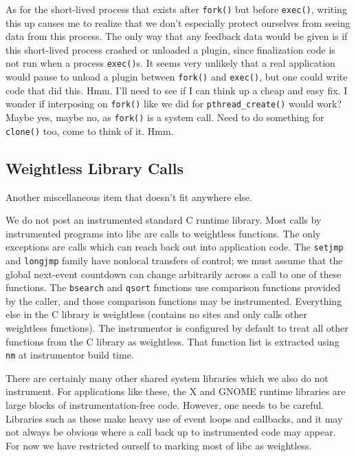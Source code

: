 \documentclass[10pt,twocolumn]{article}
\begin{document}
As for the short-lived process that exists after \texttt{fork()} but
before \texttt{exec()}, writing this up causes me to realize that we
don't especially protect ourselves from seeing data from this
process.  The only way that any feedback data would be given is if
this short-lived process crashed or unloaded a plugin, since
finalization code is not run when a process \texttt{exec()}s.  It
seems very unlikely that a real application would pause to unload a
plugin between \texttt{fork()} and \texttt{exec()}, but one could
write code that did this.  Hmm.  I'll need to see if I can think up a
cheap and easy fix.  I wonder if interposing on \texttt{fork()} like
we did for \texttt{pthread\_create()} would work?  Maybe yes, maybe
no, as \texttt{fork()} is a system call.  Need to do something for
\texttt{clone()} too, come to think of it.  Hmm.

\subsection{Weightless Library Calls}

Another miscellaneous item that doesn't fit anywhere else.

We do not post an instrumented standard C runtime library.  Most calls
by instrumented programs into libc are calls to weightless functions.
The only exceptions are calls which can reach back out into
application code.  The \texttt{setjmp} and \texttt{longjmp} family
have nonlocal transfers of control; we must assume that the global
next-event countdown can change arbitrarily across a call to one of
these functions.  The \texttt{bsearch} and \texttt{qsort} functions
use comparison functions provided by the caller, and those comparison
functions may be instrumented.  Everything else in the C library is
weightless (contains no sites and only calls other weightless
functions).  The instrumentor is configured by default to treat all
other functions from the C library as weightless.  That function list
is extracted using \texttt{nm} at instrumentor build time.

There are certainly many other shared system libraries which we also
do not instrument.  For applications like these, the X and GNOME
runtime libraries are large blocks of instrumentation-free code.
However, one needs to be careful.  Libraries such as these make heavy
use of event loops and callbacks, and it may not always be obvious
where a call back up to instrumented code may appear.  For now we have
restricted ourself to marking most of libc as weightless.
\end{document}
